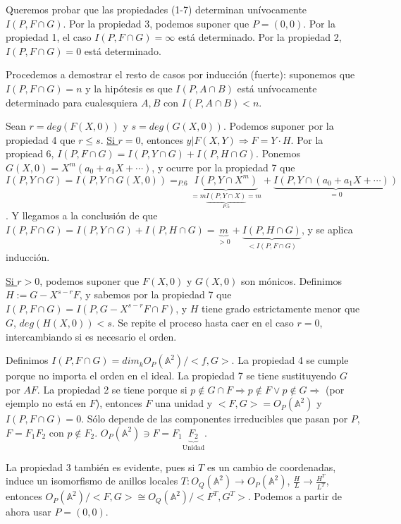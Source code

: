 \begin{Dem}
 Queremos probar que las propiedades (1-7) determinan unívocamente  $I(P,F\cap G)$. Por la propiedad 3, podemos suponer que $P=(0,0)$. Por la propiedad 1, el caso $I(P,F\cap G)= \infty$ está determinado. Por la propiedad 2, $I(P,F\cap G)=0$ está determinado. 

Procedemos a demostrar el resto de casos por inducción (fuerte): suponemos que $I(P,F\cap G)=n$ y la hipótesis es que $I(P,A\cap B)$ está unívocamente determinado para cualesquiera $A,B$ con $I(P,A\cap B)<n$. 

Sean $r= deg(F(X,0))$ y $s=deg(G(X,0))$. Podemos suponer por la propiedad 4 que $r\le s$. \underline{Si $r=0$}, entonces $y|F(X,Y) \Rightarrow F=Y\cdot H$. Por la propiead 6, $I(P,F\cap G)=I(P,Y\cap G)+I(P,H\cap G)$. Ponemos $G(X,0)= X^m(a_0+a_1X+\cdots )$, y ocurre por la propiedad 7 que $I(P,Y\cap G)=I(P,Y\cap G(X,0))=_{P.6}\underbrace{I(P,Y\cap X^m)}_{=m\underbrace{I(P,Y\cap X)}_{P.5}= m}+\underbrace{I(P,Y\cap (a_0+a_1X+\cdots))}_{=0}$. Y llegamos a la conclusión de que $I(P,F\cap G)=I(P,Y\cap G)+I(P,H\cap G)=\underbrace{m}_{>0}+\underbrace{I(P,H\cap G)}_{<I(P,F\cap G)}$, y se aplica inducción. 

\underline{ Si $r>0$}, podemos suponer que $F(X,0)$ y $G(X,0)$ son mónicos. Definimos $H:= G-X^{s-r}F$, y sabemos por la propiedad 7 que $I(P, F\cap G)=I(P,G-X^{s-r}F\cap F)$, y $H$ tiene grado estrictamente menor que $G$, $deg(H(X,0))<s$. Se repite el proceso hasta caer en el caso $r=0$, intercambiando si es necesario el orden.

 Definimos $I(P,F\cap G)=dim_k O_P(\mathbb{A}^2)/<f,G>$. La propiedad 4 se cumple porque no importa el orden en el ideal. La propiedad 7 se tiene sustituyendo $G$ por $AF$. La propiedad 2 se tiene porque si $p\notin G\cap F \Rightarrow p\notin F \vee p  \notin G \Rightarrow $ (por ejemplo no está en $F$), entonces $F$ una unidad y $<F,G> = O_P(\mathbb{A}^2)$ y $I(P,F\cap G)=0$. 
Sólo depende de las componentes irreducibles que pasan por $P$, $F=F_1F_2$ con $p\notin F_2$. $O_P(\mathbb{A}^2)\ni F=F_1\underbrace{F_2}_{\text{Unidad}}$. 

La propiedad 3 también es evidente, pues si $T$ es un cambio de coordenadas, induce un isomorfismo de anillos locales $T:O_Q(\mathbb{A}^2)\rightarrow O_P(\mathbb{A}^2)$, $\frac{H}{L} \rightarrow \frac{H^T}{L^T}$, entonces $O_P(\mathbb{A}^2)/<F,G> \cong O_Q(\mathbb{A}^2)/<F^T,G^T>$. Podemos a partir de ahora usar $P=(0,0)$. 


\end{Dem}
